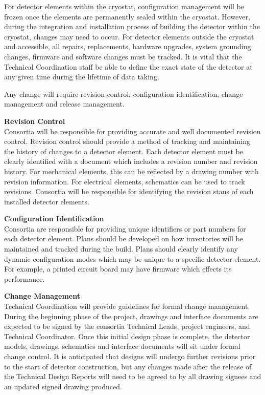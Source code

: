 For detector elements within the cryostat, configuration management
will be frozen once the elements are permanently sealed within the
cryostat.  However, during the integration and installation process of
building the detector within the cryostat, changes may need to occur.
For detector elements outside the cryostat and accessible, all
repairs, replacements, hardware upgrades, system grounding changes,
firmware and software changes must be tracked.  It is vital that the
Technical Coordination staff be able to define the exact state of the
detector at any given time during the lifetime of data taking.

Any change will require revision control, configuration
identification, change management and release management.

{\bf Revision Control}\\
Consortia will be responsible for providing accurate and well
documented revision control.  Revision control should provide a method
of tracking and maintaining the history of changes to a detector
element.  Each detector element must be clearly identified with a
document which includes a revision number and revision history.  For
mechanical elements, this can be reflected by a drawing number with
revision information.  For electrical elements, schematics can be used
to track revisions.  Consortia will be responsible for identifying the
revision staus of each installed detector elements.

{\bf Configuration Identification}\\
Consortia are responsible for providing unique identifiers or part
numbers for each detector element.  Plans should be developed on how
inventories will be maintained and tracked during the build.  Plans
should clearly identify any dynamic configuration modes which may be
unique to a specific detector element.  For example, a printed circuit
board may have firmware which effects its performance.

{\bf Change Management}\\
Technical Coordination will provide guidelines
for formal change management.  During the beginning phase of the
project, drawings and interface documents are expected to be signed by
the consortia Technical Leads, project engineers, and Technical
Coordinator.  Once this initial design phase is complete, the detector
models, drawings, schematics and interface documents will sit under
formal change control.  It is anticipated that designs will undergo
further revisions prior to the start of detector construction, but any
changes made after the release of the Technical Design Reports will
need to be agreed to by all drawing signees and an updated signed
drawing produced.

